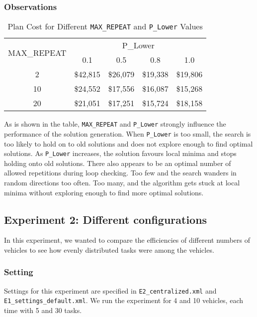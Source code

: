 \documentclass[11pt]{article}
\begin{document}
\subsubsection{Observations}


\begin{table}
	\centering
	\caption{Plan Cost for Different \texttt{MAX\_REPEAT} and \texttt{P\_Lower} Values}
	\begin{tabular}{|c|c|c|c|c|}
		\hline
		\multirow{2}{*}{MAX\_REPEAT} & \multicolumn{4}{c|}{P\_Lower} \\ \cline{2-5} 
		& 0.1 & 0.5 & 0.8 & 1.0 \\ \hline
		2 & \$42,815 & \$26,079 & \$19,338 & \$19,806 \\ \hline
		10 & \$24,552 & \$17,556 & \$16,087 & \$15,268 \\ \hline
		20 & \$21,051 & \$17,251 & \$15,724 & \$18,158 \\ \hline
	\end{tabular}
\end{table}


As is shown in the table, \texttt{MAX\_REPEAT} and \texttt{P\_Lower} strongly influence the performance of the solution generation. When \texttt{P\_Lower} is too small, the search is too likely to hold on to old solutions and does not explore enough to find optimal solutions. As \texttt{P\_Lower} increases, the solution favours local minima and stops holding onto old solutions. There also appears to be an optimal number of allowed repetitions during loop checking. Too few and the search wanders in random directions too often. Too many, and the algorithm gets stuck at local minima without exploring enough to find more optimal solutions.

\subsection{Experiment 2: Different configurations}
In this experiment, we wanted to compare the efficiencies of different numbers of vehicles to see how evenly distributed tasks were among the vehicles. 
\subsubsection{Setting}
Settings for this experiment are specified in \texttt{E2\_centralized.xml} and \texttt{E1\_settings\_default.xml}. We run the experiment for 4 and 10 vehicles, each time with 5 and 30 tasks.\\
\end{document}
